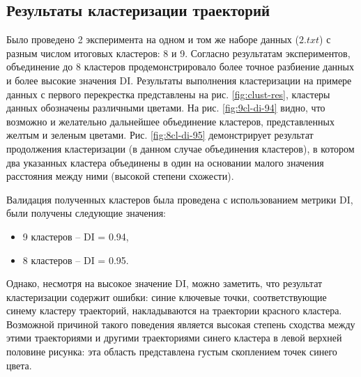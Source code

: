 \subsection{Результаты кластеризации траекторий}

Было проведено 2 эксперимента на одном и том же наборе данных ($2.txt$) с разным числом итоговых кластеров: 8 и 9. Согласно результатам экспериментов, объединение до 8 кластеров продемонстрировало более точное разбиение данных и более высокие значения DI. Результаты выполнения кластеризации на примере данных с первого перекрестка представлены на рис. \ref{fig:clust-res}, кластеры данных обозначены различными цветами. На рис. \ref{fig:9cl-di-94} видно, что возможно и желательно дальнейшее объединение кластеров, представленных желтым и зеленым цветами. Рис. \ref{fig:8cl-di-95} демонстрирует результат продолжения кластеризации (в данном случае объединения кластеров), в котором два указанных кластера объединены в один на основании малого значения расстояния между ними (высокой степени схожести).


Валидация полученных кластеров была проведена с использованием метрики DI, были получены следующие значения:
\begin{itemize}
	\item 9 кластеров -- DI = 0.94,
	\item 8 кластеров -- DI = 0.95.
\end{itemize}

Однако, несмотря на высокое значение DI, можно заметить, что результат кластеризации содержит ошибки: синие ключевые точки, соответствующие синему кластеру траекторий, накладываются на траектории красного кластера. Возможной причиной такого поведения является высокая степень сходства между этими траекториями и другими траекториями синего кластера в левой верхней половине рисунка: эта область представлена густым скоплением точек синего цвета.

